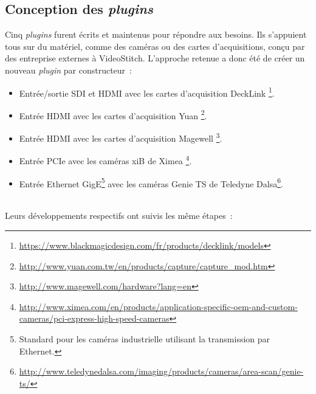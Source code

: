 \subsection{Conception des \textit{plugins}}
Cinq \textit{plugins} furent écrits et maintenus pour répondre aux besoins. Ils s'appuient 
tous sur du matériel, comme des caméras ou des cartes d'acquisitions, conçu par 
des entreprise externes à VideoStitch.
L'approche retenue a donc été de créer un nouveau \textit{plugin} par constructeur~:
\begin{itemize}
  \item Entrée/sortie SDI et HDMI avec les cartes d'acquisition DeckLink
  \footnote{\url{https://www.blackmagicdesign.com/fr/products/decklink/models}}.
  \item Entrée HDMI avec les cartes d'acquisition Yuan
  \footnote{\url{http://www.yuan.com.tw/en/products/capture/capture_mod.htm}}.
  \item Entrée HDMI avec les cartes d'acquisition Magewell
  \footnote{\url{http://www.magewell.com/hardware?lang=en}}.
  \item Entrée PCIe avec les caméras xiB de Ximea
  \footnote{\url{http://www.ximea.com/en/products/application-specific-oem-and-custom-cameras/pci-express-high-speed-cameras}}.
  \item Entrée Ethernet GigE\footnote{Standard pour les caméras industrielle utilisant 
  la transmission par Ethernet\cite{gige}.} avec les caméras Genie TS de Teledyne Dalsa\footnote{\url{http://www.teledynedalsa.com/imaging/products/cameras/area-scan/genie-ts/}}.
\end{itemize}
\ \\
Leurs développements respectifs ont suivis les même étapes~:

